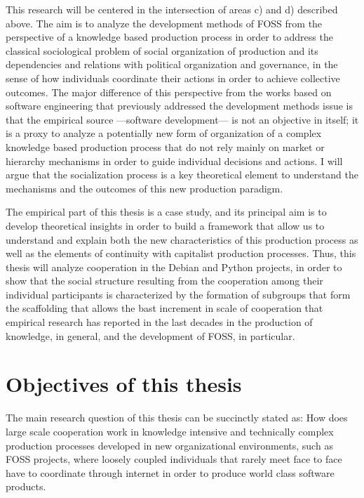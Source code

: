 This research will be centered in the intersection of areas c) and d) described above. The aim is to analyze the development methods of FOSS from the perspective of a knowledge based production process in order to address the classical sociological problem of social organization of production and its dependencies and relations with political organization and governance, in the sense of how individuals coordinate their actions in order to achieve collective outcomes. The major difference of this perspective from the works based on software engineering that previously addressed the development methods issue is that the empirical source ---software development--- is not an objective in itself; it is a proxy to analyze a potentially new form of organization of a complex knowledge based production process that do not rely mainly on market or hierarchy mechanisms in order to guide individual decisions and actions. I will argue that the socialization process is a key theoretical element to understand the mechanisms and the outcomes of this new production paradigm.

The empirical part of this thesis is a case study, and its principal aim is to develop theoretical insights in order to build a framework that allow us to understand and explain both the new characteristics of this production process as well as the elements of continuity with capitalist production processes. Thus, this thesis will analyze cooperation in the Debian and Python projects, in order to show that the social structure resulting from the cooperation among their individual participants is characterized by the formation of subgroups that form the scaffolding that allows the bast increment in scale of cooperation that empirical research has reported in the last decades in the production of knowledge, in general, and the development of FOSS, in particular.

\section{Objectives of this thesis}

The main research question of this thesis can be succinctly stated as: How does large scale cooperation work in knowledge intensive and technically complex production processes developed in new organizational environments, such as FOSS projects, where loosely coupled individuals that rarely meet face to face have to coordinate through internet in order to produce world class software products.

